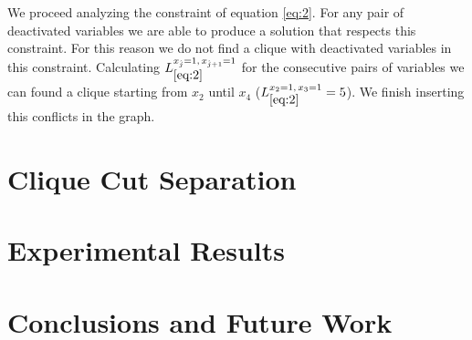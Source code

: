 \documentclass{endm}
\begin{document}
\begin{example}
We proceed analyzing the constraint of equation \ref{eq:2}. For any pair of deactivated variables we are able to produce a solution that respects this constraint. For this reason we do not find a clique with deactivated variables in this constraint. Calculating $L_{\ref{eq:2}}^{x_{\hat{j}}=1,\, x_{\hat{j}+1}=1}$ for the consecutive pairs of variables we can found a clique starting from $x_2$ until $x_4$ ($L_{\ref{eq:2}}^{x_{2}=1,\, x_{3}=1} = 5$). We finish inserting this conflicts in the graph.

\end{example}


\section{Clique Cut Separation}\label{cut}
\section{Experimental Results}\label{experiments}
\section{Conclusions and Future Work}\label{conclusions}



\end{document}
